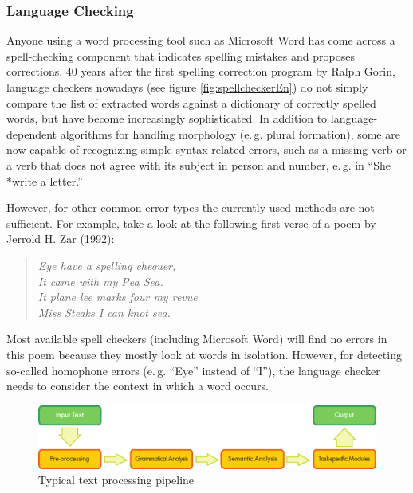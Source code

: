 \begin{multicols}{2}
\subsubsection{Language Checking}
Anyone using a word processing tool such as Microsoft Word has come
across a spell-checking component that indicates spelling mistakes and
proposes corrections. 40 years after the first spelling correction
program by Ralph Gorin, language checkers nowadays (see figure
\ref{fig:spellcheckerEn}) do not simply compare the list of extracted
words against a dictionary of correctly spelled words, but have become
increasingly sophisticated. In addition to language-dependent
algorithms for handling morphology (e.\,g. plural formation), some are
now capable of recognizing simple syntax-related errors, such as a
missing verb or a verb that does not agree with its subject in person
and number, e.\,g. in ``She *write a letter.''

However, for other common error types the currently used methods are
not sufficient. For example, take a look at the following first verse
of a poem by Jerrold H. Zar (1992):
\begin{quote}
{\em Eye have a spelling chequer,\\
It came with my Pea Sea.\\
It plane lee marks four my revue\\
Miss Steaks I can knot sea.}
\end{quote}
Most available spell checkers (including Microsoft Word) will find
no errors in this poem because they mostly look at words in
isolation. However, for detecting so-called homophone errors
(e.\,g. ``Eye'' instead of ``I''), the language checker needs to consider
the context in which a word occurs.

\begin{figure}[htb]
\begin{center}
 \includegraphics[width=\textwidth]{../_media/english/text_processing_app_architecture}
\caption{Typical text processing pipeline}
\label{fig:textprocarchiEng}
\end{center}
\end{figure}


\end{multicols}
